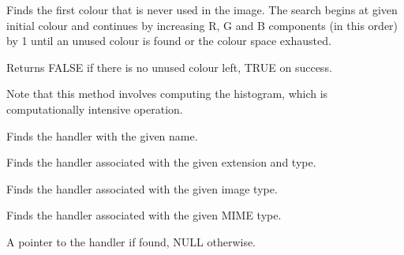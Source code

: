 


Finds the first colour that is never used in the image. The search begins at
given initial colour and continues by increasing R, G and B components (in this
order) by 1 until an unused colour is found or the colour space exhausted.


Returns FALSE if there is no unused colour left, TRUE on success.


Note that this method involves computing the histogram, which is
computationally intensive operation.



Finds the handler with the given name.


Finds the handler associated with the given extension and type.


Finds the handler associated with the given image type.


Finds the handler associated with the given MIME type.






A pointer to the handler if found, NULL otherwise.



